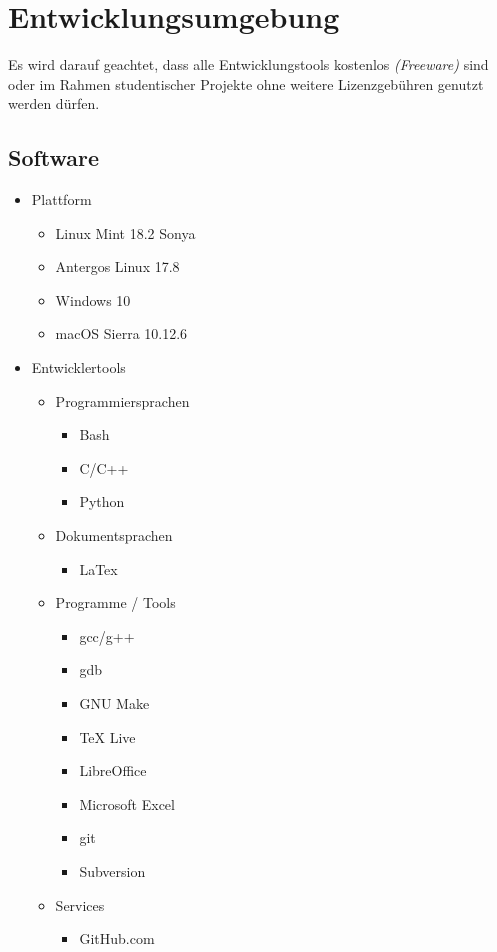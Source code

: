 \section{Entwicklungsumgebung}

Es wird darauf geachtet, dass alle Entwicklungstools kostenlos \textit{(Freeware)} sind oder im Rahmen studentischer Projekte ohne weitere Lizenzgeb\"uhren genutzt werden d\"urfen.

\subsection{Software}

\begin{itemize}
    \item Plattform
        \begin{itemize}
            \item Linux Mint 18.2 Sonya
            \item Antergos Linux 17.8
            \item Windows 10
            \item macOS Sierra 10.12.6
        \end{itemize}
    \item Entwicklertools
        \begin{itemize}
            \item Programmiersprachen
                \begin{itemize}
                    \item Bash
                    \item C/C++
                    \item Python
                \end{itemize}
            \item Dokumentsprachen
                \begin{itemize}
                    \item LaTex
                \end{itemize}
            \item Programme / Tools
                \begin{itemize}
                    \item gcc/g++
                    \item gdb
                    \item GNU Make
                    \item TeX Live
                    \item LibreOffice
                    \item Microsoft Excel
                    \item git
                    \item Subversion
                \end{itemize}
            \item Services
                \begin{itemize}
                    \item GitHub.com
                \end{itemize}
        \end{itemize}
\end{itemize}

